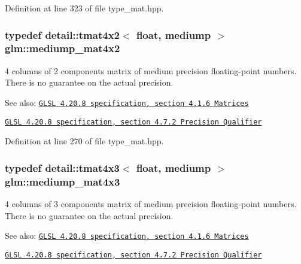 Definition at line 323 of file type\_\-mat.hpp.\hypertarget{group__core__precision_g5ade2a6a65653683f76988c45da39f15}{
\subsubsection[mediump\_\-mat4x2]{\setlength{\rightskip}{0pt plus 5cm}typedef detail::tmat4x2$<$ float, mediump $>$ {\bf glm::mediump\_\-mat4x2}}}
\label{group__core__precision_g5ade2a6a65653683f76988c45da39f15}


4 columns of 2 components matrix of medium precision floating-point numbers. There is no guarantee on the actual precision.

\begin{Desc}
\item[See also:]\href{http://www.opengl.org/registry/doc/GLSLangSpec.4.20.8.pdf}{\tt GLSL 4.20.8 specification, section 4.1.6 Matrices} 

\href{http://www.opengl.org/registry/doc/GLSLangSpec.4.20.8.pdf}{\tt GLSL 4.20.8 specification, section 4.7.2 Precision Qualifier} \end{Desc}


Definition at line 270 of file type\_\-mat.hpp.\hypertarget{group__core__precision_g445d8aac3a5227af2d1e98d5c2f74d03}{
\subsubsection[mediump\_\-mat4x3]{\setlength{\rightskip}{0pt plus 5cm}typedef detail::tmat4x3$<$ float, mediump $>$ {\bf glm::mediump\_\-mat4x3}}}
\label{group__core__precision_g445d8aac3a5227af2d1e98d5c2f74d03}


4 columns of 3 components matrix of medium precision floating-point numbers. There is no guarantee on the actual precision.

\begin{Desc}
\item[See also:]\href{http://www.opengl.org/registry/doc/GLSLangSpec.4.20.8.pdf}{\tt GLSL 4.20.8 specification, section 4.1.6 Matrices} 

\href{http://www.opengl.org/registry/doc/GLSLangSpec.4.20.8.pdf}{\tt GLSL 4.20.8 specification, section 4.7.2 Precision Qualifier} \end{Desc}


